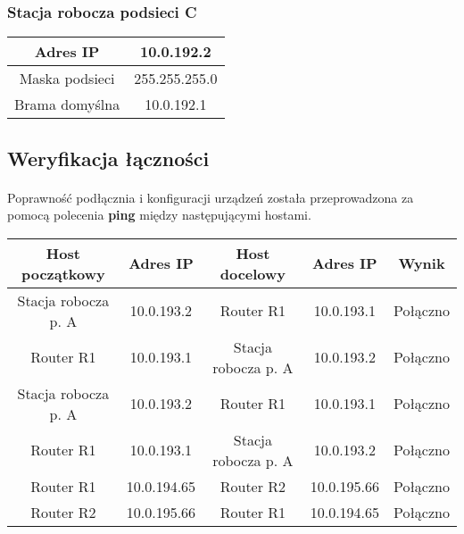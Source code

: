 \documentclass[wide,a4paper,titlepage,12pt] {article}
\begin{document}
  \subsubsection{Stacja robocza podsieci C}
  \begin{center}
    \begin{tabular}{|c|c|}
      \hline
      Adres IP & 10.0.192.2 \\
      \hline
      Maska podsieci & 255.255.255.0 \\
      \hline
      Brama domyślna & 10.0.192.1 \\
      \hline
    \end{tabular}
  \end{center}

  \subsection{Weryfikacja łączności}
  \paragraph{}
  Poprawność podłącznia i konfiguracji urządzeń została przeprowadzona za pomocą polecenia \textbf{ping} między następującymi hostami.

  \begin{center}
    \begin{tabular}{|c|c||c|c||c|}
      \hline
      Host początkowy & Adres IP & Host docelowy & Adres IP & Wynik \\
      \hline
      Stacja robocza p. A & 10.0.193.2 & Router R1 & 10.0.193.1 & Połączno \\
      Router R1 & 10.0.193.1 & Stacja robocza p. A & 10.0.193.2 & Połączno \\
      Stacja robocza p. A & 10.0.193.2 & Router R1 & 10.0.193.1 & Połączno \\
      Router R1 & 10.0.193.1 & Stacja robocza p. A & 10.0.193.2 & Połączno \\

      Router R1 & 10.0.194.65 & Router R2 & 10.0.195.66 & Połączno \\
      Router R2 & 10.0.195.66 & Router R1 & 10.0.194.65 & Połączno \\
      \hline
    \end{tabular}
  \end{center}
\end{document}
